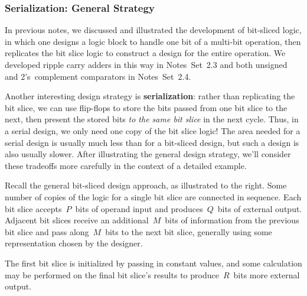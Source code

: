 \subsubsection{Serialization: General Strategy}

In previous notes, we discussed and illustrated the development of bit-sliced
logic, in which one designs a logic block to handle one bit of a multi-bit
operation, then replicates the bit slice logic to construct a design for 
the entire operation.  We developed ripple carry adders in this way in 
Notes~Set~2.3 and both unsigned and 2's~complement comparators in 
Notes~Set~2.4.
%

Another interesting design strategy is {\bf serialization}: rather than 
replicating the bit slice, we can use flip-flops to store the bits passed
from one bit slice to the next, then present the stored bits {\em to the
same bit slice} in the next cycle.  Thus, in a serial design, we only
need one copy of the bit slice logic!  The area needed for a serial design
is usually much less than for a bit-sliced design, but such a design is
also usually slower.  After illustrating the general design strategy,
we'll consider these tradeoffs more carefully
in the context of a detailed example.

\begin{minipage}{2.45in}
Recall the general bit-sliced design approach, as illustrated to the right.
%
Some number of copies of the logic for a single bit slice are connected
in sequence.  Each bit slice accepts~$P$~bits of operand input and
produces~$Q$~bits of external output.  Adjacent bit slices receive
an additional~$M$~bits of information from the previous bit slice
and pass along~$M$~bits to the next bit slice, generally using some
representation chosen by the designer.\linebreak
\end{minipage}\hspace{0.25in}%
\begin{minipage}{3.8in}
\vspace{12pt}
\end{minipage}\mpdone

The first bit slice is initialized
by passing in constant values, and some calculation may be performed
on the final bit slice's results to produce~$R$~bits more external output.

\pagebreak


